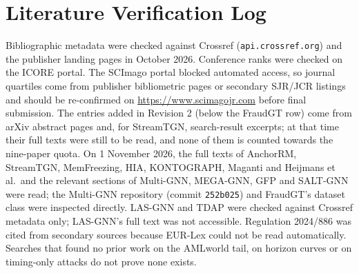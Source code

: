 \documentclass[11pt,a4paper]{article}
\begin{document}
\section{Literature Verification Log}
\label{app:verification}

Bibliographic metadata were checked against Crossref (\texttt{api.crossref.org}) and the publisher landing pages in October 2026. Conference ranks were checked on the ICORE portal. The SCImago portal blocked automated access, so journal quartiles come from publisher bibliometric pages or secondary SJR/JCR listings and should be re-confirmed on \url{https://www.scimagojr.com} before final submission. The entries added in Revision 2 (below the FraudGT row) come from arXiv abstract pages and, for StreamTGN, search-result excerpts; at that time their full texts were still to be read, and none of them is counted towards the nine-paper quota. On 1 November 2026, the full texts of AnchorRM, StreamTGN, MemFreezing, HIA, KONTOGRAPH, Maganti and Heijmans et al.\ and the relevant sections of Multi-GNN, MEGA-GNN, GFP and SALT-GNN were read; the Multi-GNN repository (commit \texttt{252b025}) and FraudGT's dataset class were inspected directly. LAS-GNN and TDAP were checked against Crossref metadata only; LAS-GNN's full text was not accessible. Regulation 2024/886 was cited from secondary sources because EUR-Lex could not be read automatically. Searches that found no prior work on the AMLworld tail, on horizon curves or on timing-only attacks do not prove none exists.
\end{document}
